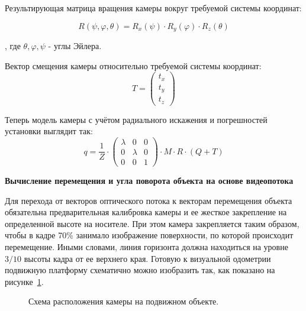 Результирующая матрица вращения камеры вокруг требуемой системы координат:

$$ R(\psi , \varphi , \theta ) = R_x(\psi ) \cdot R_y(\varphi ) \cdot R_z(\theta ) $$

, где $ \theta , \varphi , \psi $ - углы Эйлера.

Вектор смещения камеры относительно требуемой системы координат:
$$ 
T = 
\left( 
\begin{array}{c}
t_x \\ 
t_y \\ 
t_z
\end{array} 
\right) 
$$ 

Теперь модель камеры с учётом радиального искажения и погрешностей установки выглядит так\cite{cameraCalibrate}:
$$
q = \frac{1}{Z} \cdot \left( 
\begin{array}{ccc}
	\lambda & 0 & 0 \\ 
	0 & \lambda & 0 \\ 
	0 & 0 & 1
\end{array} 
\right) 
 \cdot M \cdot R \cdot (Q + T)
$$

\textbf{Вычисление перемещения и угла поворота объекта на основе видеопотока}

Для перехода от векторов оптического потока к векторам перемещения объекта обязательна предварительная калибровка камеры и ее жесткое закрепление на определенной высоте на носителе. При этом камера закрепляется таким образом, чтобы в кадре 70\% занимало изображение поверхности, по которой происходит перемещение. Иными словами, линия горизонта должна находиться на уровне $3/10$ высоты кадра от ее верхнего края. Готовую к визуальной одометрии подвижную платформу схематично можно изобразить так, как показано на рисунке~\ref{pic:objectsSchema}.

\begin{figure}[!h]
\caption{Схема расположения камеры на подвижном объекте.}
\label{pic:objectsSchema}
\end{figure}


